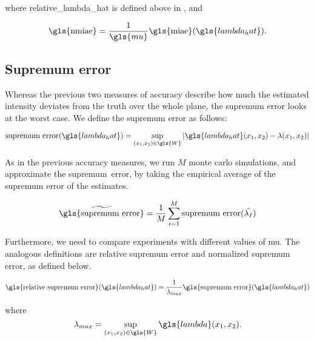 where \gls{relative_lambda_hat} is defined above in ,
and

\begin{equation}
\label{eq:nmiae}
    \mbox{\gls{nmiae}} = 
        \frac{1}{\gls{mu}} \mbox{\gls{miae}}(\gls{lambda_hat}) \text{.}
\end{equation}


\subsection{Supremum error}
\label{subsec:method:sup_error}

Whereas the previous two measures of accuracy describe how much the estimated intensity deviates from the truth over the whole plane,
the \gls{supremum error} looks at the worst case.
We define the \gls{supremum error} as follows:

\begin{equation}
    \mbox{supremum error}(\gls{lambda_hat}) = \sup_{\xvec \in \gls{W}}
        {\left|
            \gls{lambda_hat}\xvec - \lambda\xvec
        \right|}
\end{equation}

As in the previous accuracy measures, we run $M$ monte carlo simulations, and approximate the \mbox{supremum error}, by taking the empirical average of the supremum error of the estimates.

\begin{equation}
    \widetilde{\mbox{\gls{supremum error}}} = \frac{1}{M} \sum_{i=1}^{M} \mbox{supremum error}(\hat{\lambda_I})
\end{equation}

Furthermore, we need to compare experiments with different values of \gls{mu}.
The analogous definitions are \gls{relative supremum error} and \gls{normalized supremum error}, as defined below.

\begin{equation}
\label{eq:relative_supremum_error}
    \mbox{\gls{relative supremum error}}(\gls{lambda_hat}) = 
        \frac{1}{\lambda_{max}} \mbox{\gls{supremum error}}(\gls{lambda_hat})
\end{equation}

where
\begin{equation}
\label{eq:lambda_max}
    \lambda_{max} = \sup_{\xvec \in \gls{W}}{\gls{lambda}\xvec} \text{.}
\end{equation}

